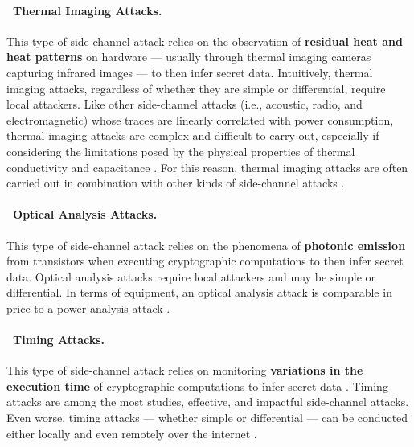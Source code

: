 
\paragraph*{\faThermometerHalf~Thermal Imaging Attacks.} This type of side-channel attack relies on the observation of \textbf{residual heat and heat patterns} on hardware --- usually through thermal imaging cameras capturing infrared images --- to then infer secret data. Intuitively, thermal imaging attacks, regardless of whether they are simple or differential, require local attackers. Like other side-channel attacks (i.e., acoustic, radio, and electromagnetic) whose traces are linearly correlated with power consumption, thermal imaging attacks are complex and difficult to carry out, especially if considering the limitations posed by the physical properties of thermal conductivity and capacitance \cite{francillon_temperature_2014}. For this reason, thermal imaging attacks are often carried out in combination with other kinds of side-channel attacks \cite{aljuffri_applying_2021}.

\paragraph*{\faCameraRetro~Optical Analysis Attacks.} This type of side-channel attack relies on the phenomena of \textbf{photonic emission} from
transistors when executing cryptographic computations \cite{ferrigno_when_2008,hutchison_simple_2012} to then infer secret data. Optical analysis attacks require local attackers and may be simple or differential. In terms of equipment, an optical analysis attack is comparable in price to a power analysis attack \cite{carmon_photonic_2017}.

\paragraph*{\faStopwatch~Timing Attacks.} This type of side-channel attack relies on monitoring \textbf{variations in the execution time} of cryptographic computations to infer secret data \cite{kocher_timing_1996}. Timing attacks are among the most studies, effective, and impactful side-channel attacks. Even worse, timing attacks --- whether simple or differential --- can be conducted either locally and even remotely over the internet \cite{brumley_remote_2003,crosby_opportunities_2009}. 

